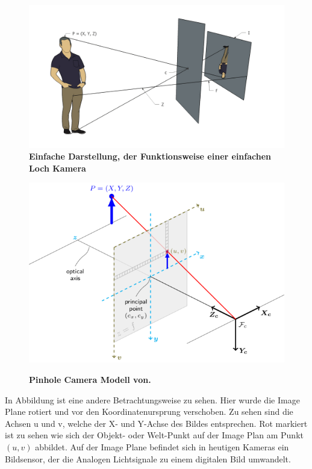 \begin{figure}
\includegraphics[width=\textwidth]{media/simple-pinhole.png}\\
\caption{\textbf{Einfache Darstellung, der Funktionsweise einer einfachen Loch Kamera}
}
\label{Fig:simple-pinhole}
\includegraphics[width=\textwidth]{media/pinhole_camera_model}\\
\caption{\textbf{Pinhole Camera Modell von.\autocite{OpencvCamera2016}}
}
\label{Fig:pinhole}
\end{figure}

In Abbildung  ist eine andere Betrachtungsweise zu sehen. Hier wurde die Image Plane rotiert und vor den Koordinatenursprung verschoben. Zu sehen sind die Achsen u und v, welche der X- und Y-Achse des Bildes entsprechen. Rot markiert ist zu sehen wie sich der Objekt- oder Welt-Punkt auf der Image Plan am Punkt $(u, v)$ abbildet. Auf der Image Plane befindet sich in heutigen Kameras ein Bildsensor, der die Analogen Lichtsignale zu einem digitalen Bild umwandelt. 

